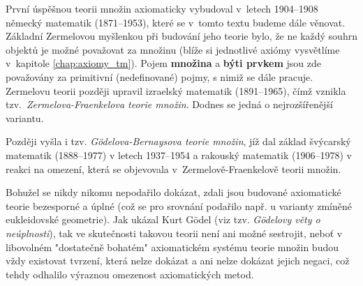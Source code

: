 První úspěšnou teorii množin axiomaticky vybudoval v~letech 1904--1908 německý matematik  (1871--1953), které se v~tomto textu budeme dále věnovat. Základní Zermelovou myšlenkou při budování jeho teorie bylo, že ne každý souhrn objektů je možné považovat za množinu (blíže si jednotlivé axiómy vysvětlíme v~kapitole \ref{chap:axiomy_tm}). Pojem \textbf{množina} a \textbf{býti prvkem} jsou zde považovány za primitivní (nedefinované) pojmy, s nimiž se dále pracuje. Zermelovu teorii později upravil izraelský matematik  (1891--1965), čímž vznikla tzv.~\emph{Zermelova-Fraenkelova teorie množin}. Dodnes se jedná o nejrozšířenější variantu.\par
Později vyšla i tzv. \emph{Gödelova-Bernaysova teorie množin}, jíž dal základ švýcarský matematik  (1888--1977) v letech 1937--1954 a rakouský matematik  (1906--1978) v reakci na omezení, která se objevovala v~Zermelově-Fraenkelově teorii množin.

Bohužel se nikdy nikomu nepodařilo dokázat, zdali jsou budované axiomatické teorie bezesporné a úplné (což se pro srovnání podařilo např. u varianty zmíněné eukleidovské geometrie). Jak ukázal Kurt Gödel (viz tzv. \emph{Gödelovy věty o neúplnosti}), tak ve skutečnosti takovou teorii není ani možné sestrojit, neboť v libovolném "dostatečně bohatém" axiomatickém systému teorie množin budou vždy existovat tvrzení, která nelze dokázat a ani nelze dokázat jejich negaci, což tehdy odhalilo výraznou omezenost axiomatických metod. 